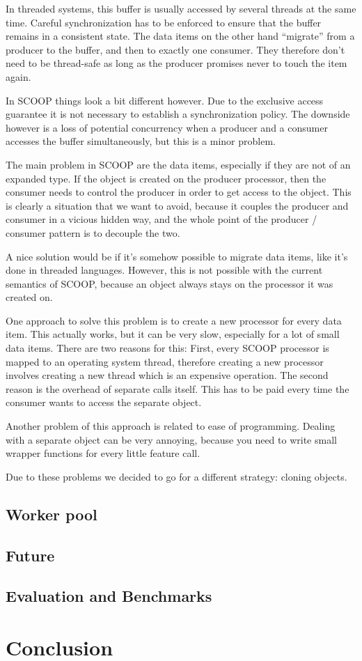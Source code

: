 \documentclass[a4paper,10pt]{report}
\begin{document}
In threaded systems, this buffer is usually accessed by several threads at the same time.
Careful synchronization has to be enforced to ensure that the buffer remains in a consistent state.
The data items on the other hand ``migrate'' from a producer to the buffer, and then to exactly one consumer.
They therefore don't need to be thread-safe as long as the producer promises never to touch the item again.

In SCOOP things look a bit different however.
Due to the exclusive access guarantee it is not necessary to establish a synchronization policy.
The downside however is a loss of potential concurrency when a producer and a consumer accesses the buffer simultaneously, but this is a minor problem.

The main problem in SCOOP are the data items, especially if they are not of an expanded type.
If the object is created on the producer processor, then the consumer needs to control the producer in order to get access to the object.
This is clearly a situation that we want to avoid, because it couples the producer and consumer in a vicious hidden way, and the whole point of the producer / consumer pattern is to decouple the two.

A nice solution would be if it's somehow possible to migrate data items, like it's done in threaded languages.
However, this is not possible with the current semantics of SCOOP, because an object always stays on the processor it was created on.

One approach to solve this problem is to create a new processor for every data item.
This actually works, but it can be very slow, especially for a lot of small data items.
There are two reasons for this:
First, every SCOOP processor is mapped to an operating system thread, therefore creating a new processor involves creating a new thread which is an expensive operation.
The second reason is the overhead of separate calls itself.
This has to be paid every time the consumer wants to access the separate object.

Another problem of this approach is related to ease of programming.
Dealing with a separate object can be very annoying, because you need to write small wrapper functions for every little feature call.

Due to these problems we decided to go for a different strategy: cloning objects.


\subsection{Worker pool}

\subsection{Future}

\subsection{Evaluation and Benchmarks}


\section{Conclusion}

\todos
\end{document}
